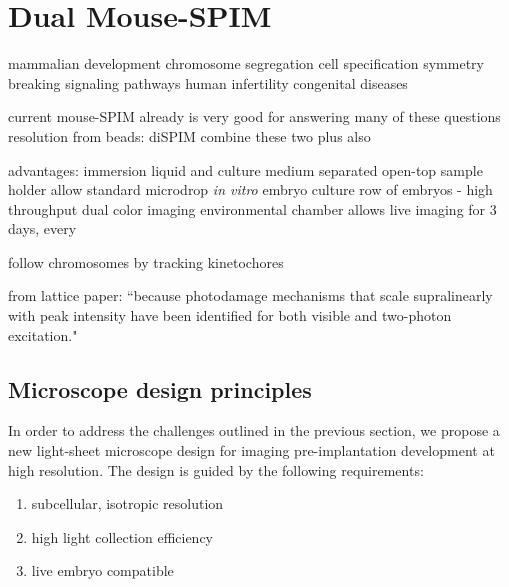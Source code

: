 

\chapter{Dual Mouse-SPIM}

\graphicspath{{./figures/2_DualMouse/}}

  mammalian development
  chromosome segregation
  cell specification
  symmetry breaking
  signaling pathways
  human infertility
  congenital diseases 

  current mouse-SPIM \cite{strnad_inverted_2016} already is very good for answering many of these questions
  resolution from beads: 
  diSPIM \cite{wu_spatially_2013}
  combine these two
  plus also \cite{balazs_development_2013}

  advantages:
    immersion liquid and culture medium separated
    open-top sample holder allow standard microdrop \textit{in vitro} embryo culture
    row of embryos - high throughput
    dual color imaging
    environmental chamber allows live imaging for 3 days, every 

  follow chromosomes by tracking kinetochores

  from lattice paper: ``because photodamage mechanisms that scale supralinearly with peak intensity have been identified for both visible \cite{donnert_major_2007} and two-photon \cite{ji_high-speed_2008} excitation."



\section{Microscope design principles}
  In order to address the challenges outlined in the previous section, we propose a new light-sheet microscope design for imaging pre-implantation development at high resolution. The design is guided by the following requirements:
  \begin{enumerate}
    \item subcellular, isotropic resolution
    \item high light collection efficiency
    \item live embryo compatible
  \end{enumerate}

